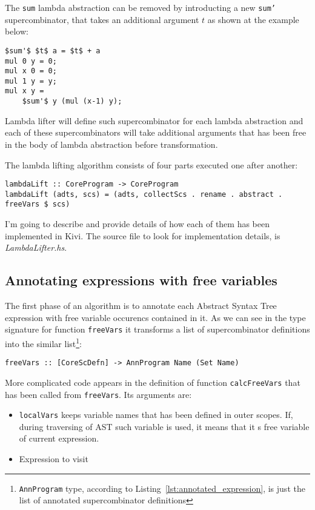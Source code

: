 \documentclass[12pt,a4paper]{report}
\begin{document}
The \texttt{sum} lambda abstraction can be removed by introducting a new
\texttt{sum'} supercombinator, that takes an additional argument $t$ as shown at
the example below:

\hspace*{-1.5in}
\begin{lstlisting}[style=haskell,mathescape=true]
$sum'$ $t$ a = $t$ + a
mul 0 y = 0;
mul x 0 = 0;
mul 1 y = y;
mul x y =
    $sum'$ y (mul (x-1) y);
\end{lstlisting}

Lambda lifter will define such supercombinator for each lambda abstraction and
each of these supercombinators will take additional arguments that has been
free in the body of lambda abstraction before transformation.

The lambda lifting algorithm consists of four parts executed one after another:

\hspace*{-1.5in}
\begin{lstlisting}[style=haskell]
lambdaLift :: CoreProgram -> CoreProgram
lambdaLift (adts, scs) = (adts, collectScs . rename . abstract . freeVars $ scs)
\end{lstlisting}

I'm going to describe and provide details of how each of them has been
implemented in Kivi. The source file to look for implementation details, is
\textit{LambdaLifter.hs}.

\subsection{Annotating expressions with free variables}
The first phase of an algorithm is to annotate each Abstract Syntax Tree
expression with free variable occurencs contained in it. As we can see in the
type signature for function \texttt{freeVars} it transforms a list of
supercombinator definitions into the similar list\footnote{\texttt{AnnProgram}
type, according to Listing~\ref{lst:annotated_expression}, is just the list of
annotated supercombinator definitions}:

\hspace*{-1.5in}
\begin{lstlisting}[style=haskell]
freeVars :: [CoreScDefn] -> AnnProgram Name (Set Name)
\end{lstlisting}

More complicated code appears in the definition of function
\texttt{calcFreeVars} that has been called from \texttt{freeVars}. Its
arguments are:
\begin{itemize}
  \item \texttt{localVars} keeps variable names that has been defined in outer
    scopes. If, during traversing of AST such variable is used, it means that
    it s free variable of current expression.
  \item Expression to visit
\end{itemize}
\end{document}

